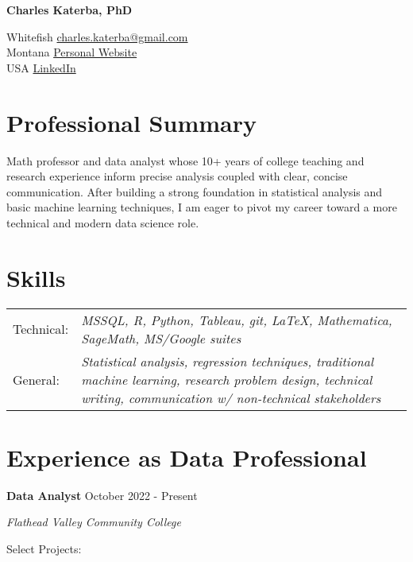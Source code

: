 \documentclass[12pt]{article}
\begin{document}
\begin{center}
     \Huge{\textbf{Charles Katerba, PhD}}
\end{center}
Whitefish \hfill \href{mailto:charles.katerba@gmail.com}{charles.katerba@gmail.com}\\
Montana \hfill \href{https://ckaterba.github.io}{Personal Website} \\ 
USA  \hfill \href{https://www.linkedin.com/in/charles-katerba-b21b50219/}{LinkedIn}

\section{Professional Summary}

Math professor and data analyst whose 10+ years of college teaching and research experience inform precise analysis coupled with clear, concise communication.  After building a strong foundation in statistical analysis and basic machine learning techniques, I am eager to pivot my career toward a more technical and modern data science role. 

\section{Skills}

\begin{tabular}{  l p{15in} }

Technical: & \textit{MSSQL, R, Python, Tableau, git, \LaTeX, Mathematica, SageMath, MS/Google suites}  \\

General: & \textit{Statistical analysis, regression techniques, traditional machine learning, research 
	\newline problem design, technical writing, communication w/ non-technical stakeholders}
\end{tabular}

\section{Experience as Data Professional}

\textbf{Data Analyst} \hfill October 2022 - Present 

\textit{Flathead Valley Community College}

Select Projects:
\end{document}
